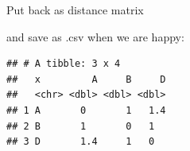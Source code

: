 \documentclass[ignorenonframetext,]{beamer}
\newenvironment{Shaded}{\begin{snugshade}}{\end{snugshade}}
\newcommand{\DataTypeTok}[1]{\textcolor[rgb]{0.13,0.29,0.53}{#1}}
\newcommand{\KeywordTok}[1]{\textcolor[rgb]{0.13,0.29,0.53}{\textbf{#1}}}
\newcommand{\NormalTok}[1]{#1}
\newcommand{\OperatorTok}[1]{\textcolor[rgb]{0.81,0.36,0.00}{\textbf{#1}}}
\newcommand{\StringTok}[1]{\textcolor[rgb]{0.31,0.60,0.02}{#1}}
\begin{document}
\begin{frame}[fragile]{Put back as distance matrix}
\protect\hypertarget{put-back-as-distance-matrix}{}

and save as .csv when we are happy:

\begin{Shaded}
\end{Shaded}

\begin{verbatim}
## # A tibble: 3 x 4
##   x         A     B     D
##   <chr> <dbl> <dbl> <dbl>
## 1 A       0       1   1.4
## 2 B       1       0   1  
## 3 D       1.4     1   0
\end{verbatim}

\begin{Shaded}
\end{Shaded}

\end{frame}
\end{document}
